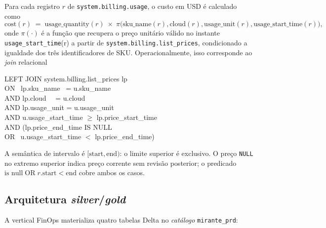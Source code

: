 \documentclass[12pt,a4paper,oneside]{article}
\begin{document}
Para cada registro \(r\) de \texttt{system.billing.usage}, o custo
em USD é calculado como
\[
  \text{cost}(r)
  \;=\;
  \text{usage\_quantity}(r) \;\times\; \pi\!\bigl(\text{sku\_name}(r),
  \text{cloud}(r), \text{usage\_unit}(r),
  \text{usage\_start\_time}(r)\bigr),
\]
onde \(\pi(\cdot)\) é a função que recupera o preço unitário válido
no instante \texttt{usage\_start\_time}(r) a partir de
\texttt{system.billing.list\_prices}, condicionado a igualdade dos
três identificadores de SKU. Operacionalmente, isso corresponde ao
\textit{join} relacional
\begin{tcolorbox}[colback=gray!5,colframe=gray!40,boxrule=0.4pt,
                  arc=2pt,left=8pt,right=8pt,top=4pt,bottom=4pt]
\small\ttfamily
LEFT JOIN system.billing.list\_prices lp \\
\hspace*{1.5em}ON \ lp.sku\_name \ = u.sku\_name \\
\hspace*{2.5em}AND lp.cloud \ \ = u.cloud \\
\hspace*{2.5em}AND lp.usage\_unit = u.usage\_unit \\
\hspace*{2.5em}AND u.usage\_start\_time \(\geq\) lp.price\_start\_time \\
\hspace*{2.5em}AND (lp.price\_end\_time IS NULL \\
\hspace*{4em}OR \ u.usage\_start\_time \(<\) lp.price\_end\_time)
\end{tcolorbox}

\noindent A semântica de intervalo é \([\text{start}, \text{end})\):
o limite superior é exclusivo. O preço \texttt{NULL} no extremo
superior indica preço corrente sem revisão posterior; o predicado
\(\text{is null} \;\text{OR}\; r.\text{start} < \text{end}\) cobre
ambos os casos.

\subsection{Arquitetura \textit{silver}/\textit{gold}}

A vertical FinOps materializa quatro tabelas Delta no
\textit{catálogo} \texttt{mirante\_prd}:
\end{document}
